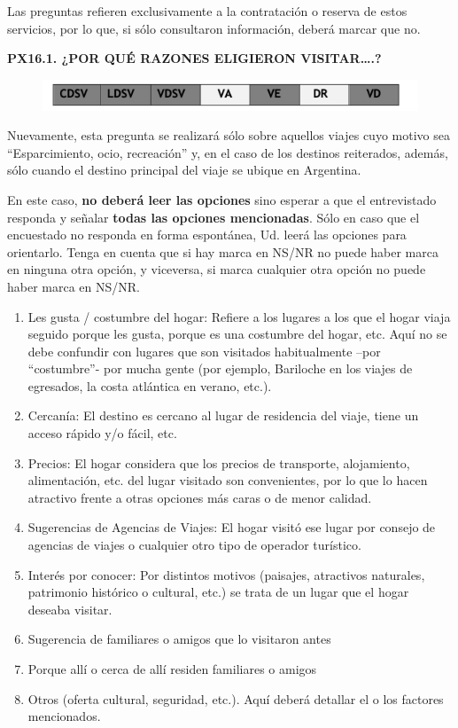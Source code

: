 \documentclass[
  openany]{book}
\providecommand{\tightlist}{%
  \setlength{\itemsep}{0pt}\setlength{\parskip}{0pt}}
\begin{document}
Las preguntas refieren exclusivamente a la contratación o reserva de estos servicios, por lo que, si sólo consultaron información, deberá marcar que no.

\textbf{PX16.1. ¿POR QUÉ RAZONES ELIGIERON VISITAR\ldots.?}

\begin{figure}

{\centering \includegraphics[width=1\linewidth]{imagenes/figura6-109} 

}

\end{figure}

Nuevamente, esta pregunta se realizará sólo sobre aquellos viajes cuyo motivo sea ``Esparcimiento, ocio, recreación'' y, en el caso de los destinos reiterados, además, sólo cuando el destino principal del viaje se ubique en Argentina.

En este caso, \textbf{no deberá leer las opciones} sino esperar a que el entrevistado responda y señalar \textbf{todas las opciones mencionadas}. Sólo en caso que el encuestado no responda en forma espontánea, Ud. leerá las opciones para orientarlo. Tenga en cuenta que si hay marca en NS/NR no puede haber marca en ninguna otra opción, y viceversa, si marca cualquier otra opción no puede haber marca en NS/NR.

\begin{enumerate}
\def\labelenumi{\arabic{enumi}.}
\tightlist
\item
  Les gusta / costumbre del hogar: Refiere a los lugares a los que el hogar viaja seguido porque les gusta, porque es una costumbre del hogar, etc. Aquí no se debe confundir con lugares que son visitados habitualmente --por ``costumbre''- por mucha gente (por ejemplo, Bariloche en los viajes de egresados, la costa atlántica en verano, etc.).
\item
  Cercanía: El destino es cercano al lugar de residencia del viaje, tiene un acceso rápido y/o fácil, etc.
\item
  Precios: El hogar considera que los precios de transporte, alojamiento, alimentación, etc. del lugar visitado son convenientes, por lo que lo hacen atractivo frente a otras opciones más caras o de menor calidad.
\item
  Sugerencias de Agencias de Viajes: El hogar visitó ese lugar por consejo de agencias de viajes o cualquier otro tipo de operador turístico.
\item
  Interés por conocer: Por distintos motivos (paisajes, atractivos naturales, patrimonio histórico o cultural, etc.) se trata de un lugar que el hogar deseaba visitar.
\item
  Sugerencia de familiares o amigos que lo visitaron antes
\item
  Porque allí o cerca de allí residen familiares o amigos
\item
  Otros (oferta cultural, seguridad, etc.). Aquí deberá detallar el o los factores mencionados.
\end{enumerate}
\end{document}

